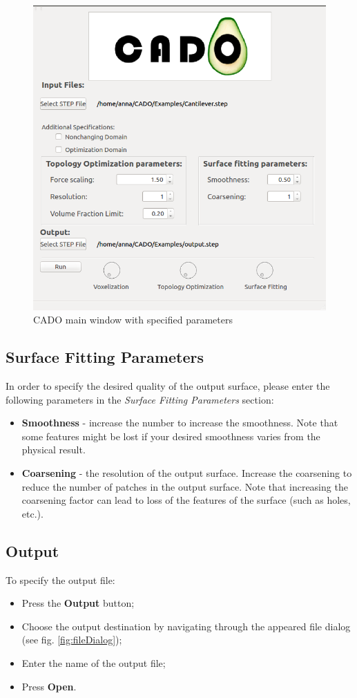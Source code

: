 \documentclass[
12pt, %
a4paper, %
oneside, %
headinclude,footinclude, %
BCOR5mm, %
]{scrartcl}
\begin{document}
\begin{figure}
\centering
\includegraphics[scale=0.4]{Pictures/CADO_mainWindowParameters.png}
\caption{CADO main window with specified parameters}
\label{fig:mainWindowParameters}
\end{figure}
\subsection{Surface Fitting Parameters}
In order to specify the desired quality of the output surface, please enter the following parameters in the \textit{Surface Fitting Parameters} section:
\begin{itemize}
\item \textbf{Smoothness} - increase the number to increase the smoothness. Note that some features might be lost if your desired smoothness varies from the physical result.
\item \textbf{Coarsening} - the resolution of the output surface.  Increase the coarsening to reduce the number of patches in the output surface. Note that increasing the coarsening factor can lead to loss of the features of the surface (such as holes, etc.).
\end{itemize}
\subsection{Output}
To specify the output file:
\begin{itemize}
\item Press the \textbf{Output} button;
\item Choose the output destination by navigating through the appeared file dialog (see fig. \ref{fig:fileDialog});
\item Enter the name of the output file;
\item Press \textbf{Open}.
\end{itemize}
\end{document}
